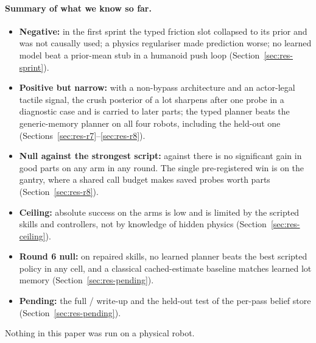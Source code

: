 \paragraph{Summary of what we know so far.}
\begin{itemize}
  \item \textbf{Negative:} in the first sprint the typed friction slot collapsed to its prior and was not
        causally used; a physics regulariser made prediction worse; no learned model beat a prior-mean stub in a
        humanoid push loop (Section~\ref{sec:res-sprint}).
  \item \textbf{Positive but narrow:} with a non-bypass architecture and an actor-legal tactile signal, the crush
        posterior of a lot sharpens after one probe in a diagnostic case and is carried to later parts; the typed planner beats the
        generic-memory planner on all four robots, including the held-out one
        (Sections~\ref{sec:res-r7}--\ref{sec:res-r8}).
  \item \textbf{Null against the strongest script:} against \pta{} there is no significant gain in good parts on
        any arm in any round. The single pre-registered win is on the gantry, where a shared call budget makes
        saved probes worth parts (Section~\ref{sec:res-r8}).
  \item \textbf{Ceiling:} absolute success on the arms is low and is limited by the scripted skills and
        controllers, not by knowledge of hidden physics (Section~\ref{sec:res-ceiling}).
  \item \textbf{Round 6 null:} on repaired skills, no learned planner beats the best scripted policy in any
        cell, and a classical cached-estimate baseline matches learned lot memory (Section~\ref{sec:res-pending}).
  \item \textbf{Pending:} the full \sysI/\sysII{} write-up and the held-out test of the per-pass belief store
        (Section~\ref{sec:res-pending}).
\end{itemize}

Nothing in this paper was run on a physical robot.
